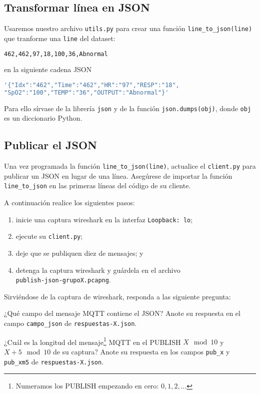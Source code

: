 \documentclass{upmassignment}
\begin{document}
\subsection*{Transformar línea en JSON}
Usaremos nuestro archivo \texttt{utils.py}
para crear una función
\texttt{line\_to\_json(line)} 
que tranforme una \texttt{line}
del dataset:
\begin{lstlisting}[language=bash]
462,462,97,18,100,36,Abnormal
\end{lstlisting}
en la siguiente cadena JSON
\begin{lstlisting}[language=bash]
'{"Idx":"462","Time":"462","HR":"97","RESP":"18",
"SpO2":"100","TEMP":"36","OUTPUT":"Abnormal"}'
\end{lstlisting}
Para ello sírvase de la librería
\texttt{json} y de la función
\texttt{json.dumps(obj)}, donde
\texttt{obj} es un diccionario Python.


\subsection*{Publicar el JSON}
Una vez programada la función
\texttt{line\_to\_json(line)},
actualice el \texttt{client.py} para
publicar un JSON en lugar de una línea.
Asegúrese de importar la función
\texttt{line\_to\_json} en las primeras
líneas del código de su cliente.

A continuación realice los siguientes
pasos:
\begin{enumerate}
    \item inicie una captura wireshark
        en la interfaz \texttt{Loopback: lo};
    \item ejecute su \texttt{client.py};
    \item deje que se publiquen diez
        de mensajes; y
    \item detenga la captura wireshark y
        guárdela en el archivo\\
        \texttt{publish-json-grupoX.pcapng}.
\end{enumerate}
Sirviéndose de la captura de wireshark,
responda a las siguiente pregunta:
\begin{problemlist}
\setcounter{enumi}{6}
    \pbitem ¿Qué campo del mensaje
        MQTT contiene el JSON?
        Anote su respuesta en el campo
        \texttt{campo\_json}
        de \texttt{respuestas-X.json}.

    \pbitem ¿Cuál es la longitud
        del mensaje\footnote{Numeramos los
        PUBLISH empezando en cero:
        $0,1,2,\ldots$} MQTT
        en el PUBLISH
        $X\mod{10}$ y $X+5\mod{10}$
        de su captura?
        Anote su respuesta en los campos
        \texttt{pub\_x} y
        \texttt{pub\_xm5}
        de \texttt{respuestas-X.json}.
\end{problemlist}
\end{document}
